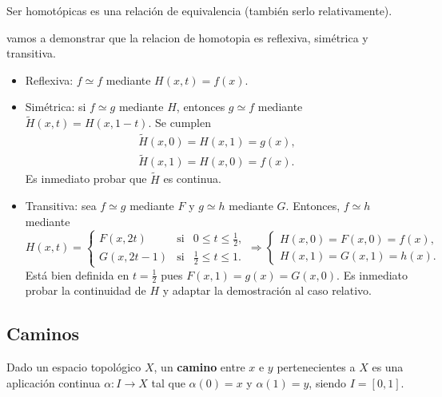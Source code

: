 \documentclass[bibtex, anon]{TEMat-article}
\begin{document}
\begin{lema} Ser homotópicas es una relación de equivalencia (también serlo relativamente).
\end{lema}
\begin{demostracion}
vamos a demonstrar que la relacion de homotopia es reflexiva, simétrica y transitiva.
	\begin{itemize}
		\item Reflexiva: $f\simeq f$ mediante $H(x,t)=f(x)$.
		\item Simétrica: si $f\simeq g$ mediante $H$, entonces $g\simeq f$ mediante $\widetilde{H}(x,t)=H(x,1-t)$. Se cumplen
		\begin{gather*}
		\widetilde{H}(x,0)=H(x,1)=g(x),\\
		\widetilde{H}(x,1)=H(x,0)=f(x).
		\end{gather*}
		Es inmediato probar que $\widetilde{H}$ es continua.
		\item Transitiva: sea $f\simeq g$ mediante $F$ y $g\simeq h$ mediante $G$. Entonces, $f\simeq h$ mediante
		\begin{equation*}
		H(x,t)=\left\{\begin{array}{ccc}
		F(x,2t) & \text{si} & 0\leq t\leq\frac{1}{2},\\
		G(x,2t-1) & \text{si} & \frac{1}{2}\leq t\leq 1.
		\end{array}\right.\Longrightarrow\left\{\begin{array}{c}
		H(x,0)=F(x,0)=f(x),\\
		H(x,1)=G(x,1)=h(x).
		\end{array}\right.
		\end{equation*}
		Está bien definida en $t=\frac{1}{2}$ pues $F(x,1)=g(x)=G(x,0)$. Es inmediato probar la continuidad de $H$ y adaptar la demostración al caso relativo.
	\end{itemize}
\end{demostracion}

\subsection{Caminos}

\begin{definicion}
Dado un espacio topológico $X$, un \textbf{camino} entre $x$ e $y$ pertenecientes a $X$ es una aplicación continua $\alpha:I\to X$ tal que $\alpha(0)=x$ y $\alpha(1)=y$, siendo $I=[0,1]$. %
\end{definicion}
\end{document}
